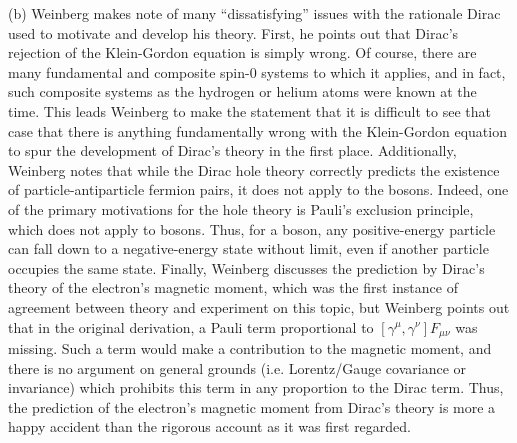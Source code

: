 {(b) Weinberg makes note of many ``dissatisfying'' issues with the rationale Dirac used to motivate and develop his theory.
First, he points out that Dirac's rejection of the Klein-Gordon equation is simply wrong.
Of course, there are many fundamental and composite spin-0 systems to which it applies, and in fact, such composite systems as the hydrogen or helium atoms were known at the time.
This leads Weinberg to make the statement that it is difficult to see that case that there is anything fundamentally wrong with the Klein-Gordon equation to spur the development of Dirac's theory in the first place.
Additionally, Weinberg notes that while the Dirac hole theory correctly predicts the existence of particle-antiparticle fermion pairs, it does not apply to the bosons.
Indeed, one of the primary motivations for the hole theory is Pauli's exclusion principle, which does not apply to bosons.
Thus, for a boson, any positive-energy particle can fall down to a negative-energy state without limit, even if another particle occupies the same state.
Finally, Weinberg discusses the prediction by Dirac's theory of the electron's magnetic moment, which was the first instance of agreement between theory and experiment on this topic, but Weinberg points out that in the original derivation, a Pauli term proportional to $[\gamma^{\mu},\gamma^{\nu}] F_{\mu\nu}$ was missing.
Such a term would make a contribution to the magnetic moment, and there is no argument on general grounds (i.e. Lorentz/Gauge covariance or invariance) which prohibits this term in any proportion to the Dirac term.
Thus, the prediction of the electron's magnetic moment from Dirac's theory is more a happy accident than the rigorous account as it was first regarded.

}

    

